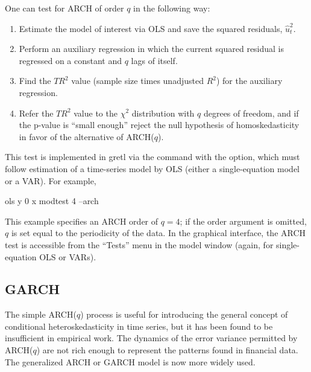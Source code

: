One can test for ARCH of order $q$ in the following
way:
\begin{enumerate}
\item Estimate the model of interest via OLS and save the squared
  residuals, $\hat{u}^2_t$.
\item Perform an auxiliary regression in which the current squared
  residual is regressed on a constant and $q$ lags of itself.
\item Find the $TR^2$ value (sample size times unadjusted $R^2$) for
  the auxiliary regression.
\item Refer the $TR^2$ value to the $\chi^2$ distribution with $q$
  degrees of freedom, and if the p-value is ``small enough'' reject
  the null hypothesis of homoskedasticity in favor of the alternative
  of ARCH($q$).
\end{enumerate}

This test is implemented in gretl via the  command
with the  option, which must follow estimation of a
time-series model by OLS (either a single-equation model or a
VAR). For example,
%
\begin{code}
ols y 0 x
modtest 4 --arch
\end{code}

This example specifies an ARCH order of $q=4$; if the order argument
is omitted, $q$ is set equal to the periodicity of the data.  In the
graphical interface, the ARCH test is accessible from the ``Tests''
menu in the model window (again, for single-equation OLS or VARs).

\subsection{GARCH}
\label{subsec:garch}

The simple ARCH($q$) process is useful for introducing the general
concept of conditional heteroskedasticity in time series, but it has
been found to be insufficient in empirical work.  The dynamics of the
error variance permitted by ARCH($q$) are not rich enough to represent 
the patterns found in financial data.  The generalized ARCH or GARCH
model is now more widely used.  


